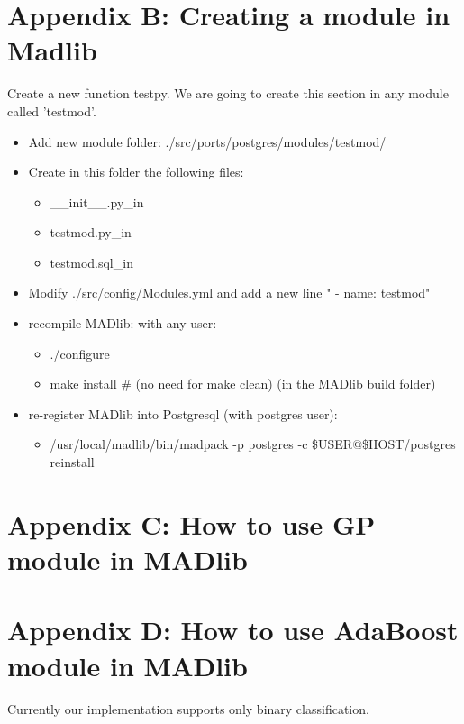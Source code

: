 \section*{Appendix B: Creating a module in Madlib}

Create a new function testpy. We are going to create this section in any module called 'testmod'.

\begin{itemize}
  \item Add new module folder: ./src/ports/postgres/modules/testmod/
  \item Create in this folder the following files:

\begin{itemize}
  \item \_\_init\_\_.py\_in  
  \item testmod.py\_in
  \item testmod.sql\_in
\end{itemize}

\item Modify ./src/config/Modules.yml and add a new line "	- name: testmod"
  \item recompile MADlib: with any user:

\begin{itemize}
  \item ./configure
  \item make install      \# (no need for make clean) (in the MADlib build folder)
\end{itemize}
  \item re-register MADlib into Postgresql (with postgres user):
  \begin{itemize}
  \item  /usr/local/madlib/bin/madpack -p postgres -c \$USER@\$HOST/postgres reinstall
  \end{itemize}
 \end{itemize}
 


\section*{Appendix C: How to use GP module in MADlib}


\section*{Appendix D: How to use AdaBoost module in MADlib}
Currently our implementation supports only binary classification.

